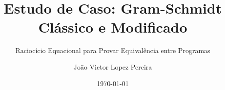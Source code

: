 




\title{Estudo de Caso: Gram-Schmidt Clássico e Modificado}
\subtitle{Raciocício Equacional para Provar Equivalência entre Programas}
\author{João Victor Lopez Pereira}
\date{\today}
